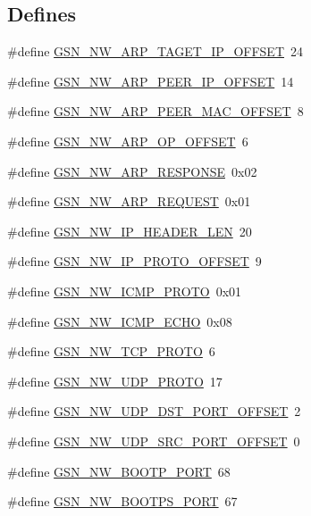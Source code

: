 \subsection*{Defines}
\begin{DoxyCompactItemize}
\item 
\#define \hyperlink{a00532_ad16a74995519cf1e9a0582465b6940fd}{GSN\_\-NW\_\-ARP\_\-TAGET\_\-IP\_\-OFFSET}~24
\item 
\#define \hyperlink{a00532_abdfd0939d6b0f786637f26a1c943865c}{GSN\_\-NW\_\-ARP\_\-PEER\_\-IP\_\-OFFSET}~14
\item 
\#define \hyperlink{a00532_a9b5b58bcdadeeab74b1deef43d795355}{GSN\_\-NW\_\-ARP\_\-PEER\_\-MAC\_\-OFFSET}~8
\item 
\#define \hyperlink{a00532_a3e00b78ae8a5afbd08f41fffd9acc20f}{GSN\_\-NW\_\-ARP\_\-OP\_\-OFFSET}~6
\item 
\#define \hyperlink{a00532_a9e91355342fa43502e204bfbfb645f79}{GSN\_\-NW\_\-ARP\_\-RESPONSE}~0x02
\item 
\#define \hyperlink{a00532_a7b44cb1dd0d6ce46cea9ef963a33140b}{GSN\_\-NW\_\-ARP\_\-REQUEST}~0x01
\item 
\#define \hyperlink{a00532_a0c03d87409256ce8a7b5162a21abd999}{GSN\_\-NW\_\-IP\_\-HEADER\_\-LEN}~20
\item 
\#define \hyperlink{a00532_a99679d7963b105a5cd3e5147d7e9a975}{GSN\_\-NW\_\-IP\_\-PROTO\_\-OFFSET}~9
\item 
\#define \hyperlink{a00532_ae53b9a1d86963af5d24f245c8895ef39}{GSN\_\-NW\_\-ICMP\_\-PROTO}~0x01
\item 
\#define \hyperlink{a00532_a9e1d162e9273038a81a8df526cdad4f6}{GSN\_\-NW\_\-ICMP\_\-ECHO}~0x08
\item 
\#define \hyperlink{a00532_afe27d1a9e2891e6939362b0ad9ea8430}{GSN\_\-NW\_\-TCP\_\-PROTO}~6
\item 
\#define \hyperlink{a00532_a71538a17a95630ca5c9571eafc64e3f2}{GSN\_\-NW\_\-UDP\_\-PROTO}~17
\item 
\#define \hyperlink{a00532_aff1de9469dd7dfe4602cf6f1ec811fc1}{GSN\_\-NW\_\-UDP\_\-DST\_\-PORT\_\-OFFSET}~2
\item 
\#define \hyperlink{a00532_aa423d3b52e047f9e63851c51c661af6f}{GSN\_\-NW\_\-UDP\_\-SRC\_\-PORT\_\-OFFSET}~0
\item 
\#define \hyperlink{a00532_a4d69f6d33a61ac5637e874ff68bfa566}{GSN\_\-NW\_\-BOOTP\_\-PORT}~68
\item 
\#define \hyperlink{a00532_ab42745a3d96ab5a190e78201bcdcf6f3}{GSN\_\-NW\_\-BOOTPS\_\-PORT}~67
\item 

\end{DoxyCompactItemize}
